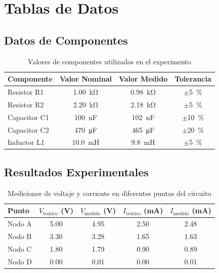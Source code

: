 \documentclass[a4paper, 12pt]{article}
\begin{document}
\section{Tablas de Datos}

\subsection{Datos de Componentes}

\begin{table}[H]
    \centering
    \caption{Valores de componentes utilizados en el experimento}
    \label{tab:componentes}
    \begin{tabular}{l S[table-format=3.2] S[table-format=3.2] c}
        \toprule
        \textbf{Componente} & {\textbf{Valor Nominal}} & {\textbf{Valor Medido}} & \textbf{Tolerancia} \\
        \midrule
        Resistor R1  & \SI{1.00}{\kilo\ohm} & \SI{0.98}{\kilo\ohm} & $\pm$\SI{5}{\percent} \\
        Resistor R2  & \SI{2.20}{\kilo\ohm} & \SI{2.18}{\kilo\ohm} & $\pm$\SI{5}{\percent} \\
        Capacitor C1 & \SI{100}{\nano\farad} & \SI{102}{\nano\farad} & $\pm$\SI{10}{\percent} \\
        Capacitor C2 & \SI{470}{\micro\farad} & \SI{465}{\micro\farad} & $\pm$\SI{20}{\percent} \\
        Inductor L1  & \SI{10.0}{\milli\henry} & \SI{9.8}{\milli\henry} & $\pm$\SI{5}{\percent} \\
        \bottomrule
    \end{tabular}
\end{table}

\subsection{Resultados Experimentales}

\begin{table}[H]
    \centering
    \caption{Mediciones de voltaje y corriente en diferentes puntos del circuito}
    \label{tab:mediciones}
    \begin{tabular}{l S[table-format=1.2] S[table-format=1.2] S[table-format=1.2] S[table-format=1.2]}
        \toprule
        \textbf{Punto} & {\textbf{$V_{\text{teórico}}$ (\si{\volt})}} & {\textbf{$V_{\text{medido}}$ (\si{\volt})}} & {\textbf{$I_{\text{teórico}}$ (\si{\milli\ampere})}} & {\textbf{$I_{\text{medido}}$ (\si{\milli\ampere})}} \\
        \midrule
        Nodo A & 5.00 & 4.95 & 2.50 & 2.48 \\
        Nodo B & 3.30 & 3.28 & 1.65 & 1.63 \\
        Nodo C & 1.80 & 1.79 & 0.90 & 0.89 \\
        Nodo D & 0.00 & 0.01 & 0.00 & 0.01 \\
        \bottomrule
    \end{tabular}
\end{table}
\end{document}
